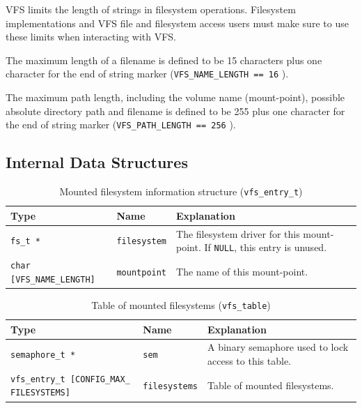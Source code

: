 \documentclass[twoside,a4paper]{report}
\newcommand{\PBS}[1]{\let\temp=\\#1\let\\=\temp}
\newlength{\tablewidth}
\newenvironment{structdescription}{%
\begin{center}%
\begin{tabular}{p{3.5cm}|p{2.5cm}|>{\PBS\raggedright}p{\tablewidth-6\tabcolsep-6cm}}%
\textbf{Type} & \textbf{Name} & \textbf{Explanation} \\ %
}{%
\end{tabular}%
\end{center}%
}
\newcommand{\structfield}[3]{%
\hline%
\texttt{#1} & \texttt{#2} & #3 \\%
}
\begin{document}

VFS limits the length of strings in filesystem operations. Filesystem
implementations and VFS file and filesystem access users must make
sure to use these limits when interacting with VFS.

 
The maximum length of a filename is defined to be 15 characters plus
one character for the end of string marker (\texttt{VFS\_NAME\_LENGTH
== 16} ).

 
The maximum path length, including the volume name (mount-point),
possible absolute directory path and filename is defined to be 255
plus one character for the end of string marker
(\texttt{VFS\_PATH\_LENGTH == 256}
).


\subsection{Internal Data Structures}

\begin{table}
\begin{structdescription}

\structfield{fs\_t *}{filesystem}{The filesystem driver for this
mount-point. If \texttt{NULL}, this entry is unused.}

\structfield{char [VFS\_NAME\_LENGTH]}{mountpoint}{The name of this
mount-point.}

\end{structdescription}
\caption{Mounted filesystem information structure (\texttt{vfs\_entry\_t})}
\label{tab:vfsentryt}
\end{table}

\begin{table}
\begin{structdescription}

\structfield{semaphore\_t *}{sem}{A binary semaphore used to lock
access to this table.}

\structfield{vfs\_entry\_t [CONFIG\_MAX\_
FILESYSTEMS]}{filesystems}{Table of mounted filesystems.}

\end{structdescription}
\caption{Table of mounted filesystems (\texttt{vfs\_table})}
\label{tab:vfstable}
\end{table}
\end{document}
